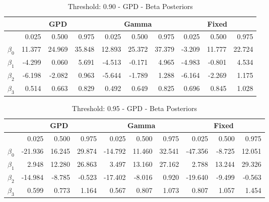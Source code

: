 \documentclass[11pt]{article}
\begin{document}
\begin{table}[htdp]
\caption{Threshold: 0.90 - GPD - Beta Posteriors}
\begin{center}
\begin{tabular}{|c|rrr|rrr|rrr|}
	 &\multicolumn{3}{c|}{GPD}& \multicolumn{3}{c|}{Gamma}& \multicolumn{3}{c|}{Fixed}\\
	\hline
			& 0.025		&	0.500	&	0.975& 0.025		&	0.500	&	0.975& 0.025		&	0.500	&	0.975\\
	\hline
	\hline
	$\beta_0$	& 11.377	&	24.969	&	35.848& 12.893	&	25.372	&	37.379& -3.209	&	11.777	&	22.724\\
	\hline
	$\beta_1$	& -4.299	&	0.060	&	5.691& -4.513	&	-0.171	&	4.965& -4.983	&	-0.801	&	4.534\\
	\hline
	$\beta_2$	& -6.198	&	-2.082	&	0.963& -5.644	&	-1.789	&	1.288& -6.164	&	-2.269	&	1.175\\
	\hline
	$\beta_3$	& 0.514		&	0.663	&	0.829& 0.492		&	0.649	&	0.825& 0.696		&	0.845	&	1.028\\
	\hline	
\end{tabular}
\end{center}
\label{lbl:beta90}
\end{table}%


\begin{table}[htdp]
\caption{Threshold: 0.95 - GPD - Beta Posteriors}
\begin{center}
\begin{tabular}{|c|rrr|rrr|rrr|}
	 &\multicolumn{3}{c|}{GPD}& \multicolumn{3}{c|}{Gamma}& \multicolumn{3}{c|}{Fixed}\\
	\hline
			& 0.025		&	0.500	&	0.975& 0.025		&	0.500	&	0.975& 0.025		&	0.500	&	0.975\\
	\hline
	\hline
	$\beta_0$	& -21.936	&	16.245	&	29.874& -14.792	&	11.460	&	32.541& -47.356	&	-8.725	&	12.051\\
	\hline
	$\beta_1$	& 2.948		&	12.280	&	26.863& 3.497		&	13.160	&	27.162& 2.788		&	13.244	&	29.326\\
	\hline
	$\beta_2$	& -14.984	&	-8.785	&	-0.523& -17.402	&	-8.016	&	0.920& -19.640	&	-9.499	&	-0.563\\
	\hline
	$\beta_3$	& 0.599		&	0.773	&	1.164& 0.567		&	0.807	&	1.073& 0.807		&	1.057	&	1.454\\
	\hline	
\end{tabular}
\end{center}
\label{lbl:beta95}
\end{table}%
\end{document}
